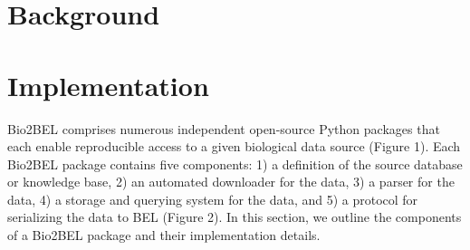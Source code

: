 \documentclass{bmcart}
\begin{document}
\begin{frontmatter}
\begin{abstractbox}
\begin{keyword}
\end{keyword}


\end{abstractbox}
%

\end{frontmatter}



\section*{Background}


\section*{Implementation}

Bio2BEL comprises numerous independent open-source Python packages that each enable reproducible access to a given biological data source (Figure 1).
Each Bio2BEL package contains five components: 1) a definition of the source database or knowledge base, 2) an automated downloader for the data, 3) a parser for the data, 4) a storage and querying system for the data, and 5) a protocol for serializing the data to BEL (Figure 2).
In this section, we outline the components of a Bio2BEL package and their implementation details.
\end{document}
